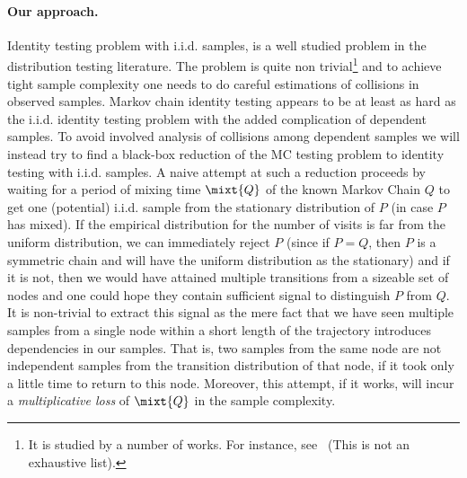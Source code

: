 \paragraph{Our approach.}
Identity testing problem with i.i.d. samples, is a well studied problem in the
distribution testing literature. The problem is quite non trivial\footnote{It is studied by a number of works. For instance, see~\cite{BatuFFKRW01,Paninski08,ValiantV14,AcharyaDK15,DiakonikolasK16} (This is not an exhaustive list).} 
and to achieve tight sample complexity one needs to do careful estimations of collisions in observed samples.
Markov chain identity testing appears to be at least as hard as the i.i.d. identity testing problem with the added complication of dependent samples.
To avoid involved analysis of collisions among dependent samples we will instead try to find a black-box reduction of the MC testing problem to identity testing with i.i.d. samples.
A naive attempt at such a reduction proceeds by waiting for a period of mixing time $\mixt{Q}$ of the known Markov Chain $Q$ to get one (potential) i.i.d. sample from the 
stationary distribution of $P$ (in case $P$ has mixed). If the empirical distribution for the number of visits is far from the uniform distribution, we can 
immediately reject $P$ (since if $P=Q$, then $P$ is a symmetric chain and will have the uniform distribution as the stationary) and if it is not, then we would have attained multiple transitions from a sizeable set of nodes and one could hope they contain sufficient signal to distinguish $P$ from $Q$. 
It is non-trivial to extract this signal as the mere fact that we have seen multiple samples from a single node within a short length of the trajectory introduces dependencies in our samples. That is, two samples from the same node are not independent samples from the transition distribution of that node, if it took only a little time to return to this node. Moreover, this attempt, if it works, will incur a \emph{multiplicative loss} of $\mixt{Q}$ in the sample complexity.\\
%


